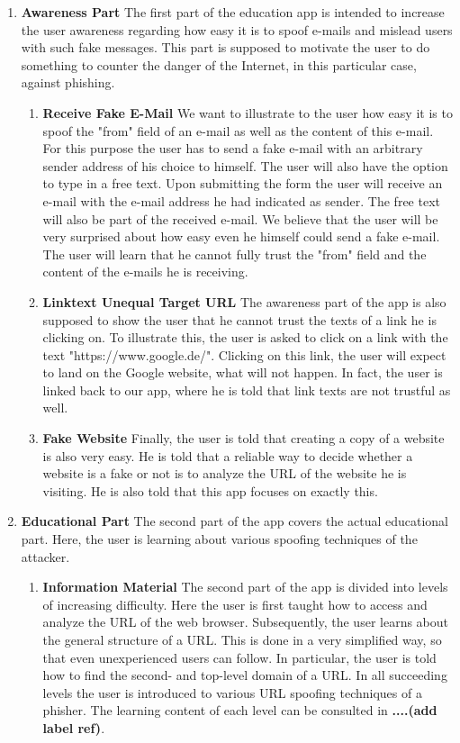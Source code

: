 \begin{enumerate}
	\item \textbf{Awareness Part} The first part of the education app is intended to increase the user awareness regarding how easy it is to spoof e-mails and mislead users with such fake messages. This part is supposed to motivate the user to do something to counter the danger of the Internet, in this particular case, against phishing.
	\begin{enumerate}
		\item \textbf{Receive Fake E-Mail} We want to illustrate to the user how easy it is to spoof the "from" field of an e-mail as well as the content of this e-mail. For this purpose the user has to send a fake e-mail with an arbitrary sender address of his choice to himself. The user will also have the option to type in a free text. Upon submitting the form the user will receive an e-mail with the e-mail address he had indicated as sender. The free text will also be part of the received e-mail. We believe that the user will be very surprised about how easy even he himself could send a fake e-mail. The user will learn that he cannot fully trust the "from" field and the content of the e-mails he is receiving.
		\item \textbf{Linktext Unequal Target URL} The awareness part of the app is also supposed to show the user that he cannot trust the texts of a link he is clicking on. To illustrate this, the user is asked to click on a link with the text "https://www.google.de/". Clicking on this link, the user will expect to land on the Google website, what will not happen. In fact, the user is linked back to our app, where he is told that link texts are not trustful as well. 
	\item \textbf{Fake Website} Finally, the user is told that creating a copy of a website is also very easy. He is told that a reliable way to decide whether a website is a fake or not is to analyze the URL of the website he is visiting. He is also told that this app focuses on exactly this.
	\end{enumerate}
	\item \textbf{Educational Part} The second part of the app covers the actual educational part. Here, the user is learning about various spoofing techniques of the attacker.
	\begin{enumerate}
		\item \textbf{Information Material} The second part of the app is divided into levels of increasing difficulty. Here the user is first taught how to access and analyze the URL of the web browser. Subsequently, the user learns about the general structure of a URL. This is done in a very simplified way, so that even unexperienced users can follow. In particular, the user is told how to find the second- and top-level domain of a URL. In all succeeding levels the user is introduced to various URL spoofing techniques of a phisher. The learning content of each level can be consulted in \textbf{....(add label ref)}.

\end{enumerate}
\end{enumerate}
